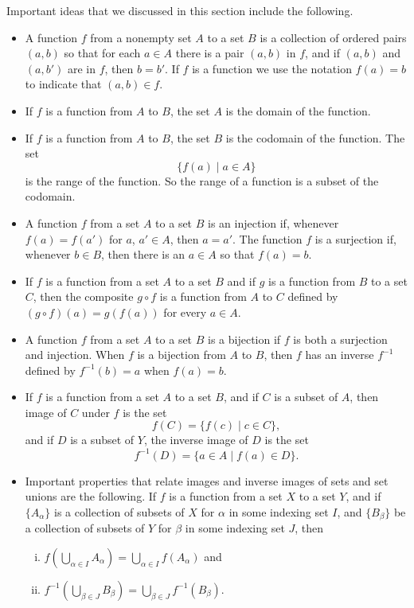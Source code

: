 \label{sec_func_summ}
Important ideas that we discussed in this section include the following.
\begin{itemize}
\item A function $f$ from a nonempty set $A$ to a set $B$ is a collection of ordered pairs $(a,b)$ so that for each $a \in A$ there is a pair $(a,b)$ in $f$, and if $(a,b)$ and $(a,b')$ are in $f$, then $b=b'$.  If $f$ is a function we use the notation $f(a) = b$ to indicate that $(a,b) \in f$. 
\item If $f$ is a function from $A$ to $B$, the set $A$ is the domain of the function.
\item If $f$ is a function from $A$ to $B$, the set $B$ is the codomain of the function. The set 
\[\{f(a) \mid a \in A\}\]
 is the range of the function. So the range of a function is a subset of the codomain.  
\item A function $f$ from a set $A$ to a set $B$ is an injection if, whenever $f(a) = f(a')$ for $a$, $a' \in A$, then $a = a'$. The function $f$ is a surjection if, whenever $b \in B$, then there is an $a \in A$ so that $f(a)=b$. 
\item If $f$ is a function from a set $A$ to a set $B$ and if $g$ is a function from $B$ to a set $C$, then the composite $g \circ f$ is a function from $A$ to $C$ defined by $(g \circ f)(a) = g(f(a))$ for every $a \in A$. 
\item A function $f$ from a set $A$ to a set $B$ is a bijection if $f$ is both a surjection and injection. When $f$ is a bijection from $A$ to $B$, then $f$ has an inverse $f^{-1}$ defined by $f^{-1}(b) = a$ when $f(a) = b$. 
\item If $f$ is a function from a set $A$ to a set $B$, and if $C$ is a subset of $A$, then image of $C$ under $f$ is the set 
\[f(C) = \{f(c) \mid c \in C\},\]
and if $D$ is a subset of $Y$, the inverse image of $D$ is the set 
\[f^{-1}(D) = \{a \in A \mid f(a) \in D\}.\]
\item Important properties that relate images and inverse images of sets and set unions are the following. If $f$ is a function from a set $X$ to a set $Y$, and if $\{A_{\alpha}\}$ is a collection of subsets of $X$ for $\alpha$ in some indexing set $I$, and $\{B_{\beta}\}$ be a collection of subsets of $Y$ for $\beta$ in some indexing set $J$, then  
\begin{enumerate}[i.]
\item $f\left(\bigcup_{\alpha \in I} A_{\alpha}\right) = \bigcup_{\alpha \in I} f(A_{\alpha})$ and
\item $f^{-1}\left(\bigcup_{\beta \in J} B_{\beta}\right) = \bigcup_{\beta \in J} f^{-1}(B_{\beta})$.
\end{enumerate}
\end{itemize}

